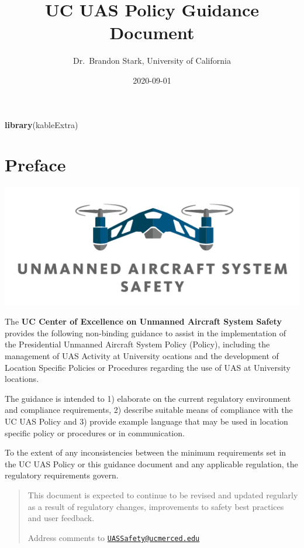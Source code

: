 \documentclass[
]{book}
\title{UC UAS Policy Guidance Document}
\author{Dr.~Brandon Stark, University of California}
\date{2020-09-01}
\newenvironment{Shaded}{\begin{snugshade}}{\end{snugshade}}
\newcommand{\KeywordTok}[1]{\textcolor[rgb]{0.13,0.29,0.53}{\textbf{#1}}}
\newcommand{\NormalTok}[1]{#1}
\begin{document}
\maketitle

{
\setcounter{tocdepth}{1}
\tableofcontents
}
\begin{Shaded}
\begin{Highlighting}[]
\KeywordTok{library}\NormalTok{(kableExtra)}
\end{Highlighting}
\end{Shaded}

\hypertarget{preface}{%
\chapter*{Preface}\label{preface}}

\begin{center}\includegraphics[width=0.5\linewidth]{images/COE_logo} \end{center}

The \textbf{UC Center of Excellence on Unmanned Aircraft System Safety} provides the following non-binding guidance to assist in the implementation of the Presidential Unmanned Aircraft System Policy (Policy), including the management of UAS Activity at University ocations and the development of Location Specific Policies or Procedures regarding the use of UAS at University locations.

The guidance is intended to 1) elaborate on the current regulatory environment and compliance requirements, 2) describe suitable means of compliance with the UC UAS Policy and 3) provide example language that may be used in location specific policy or procedures or in communication.

To the extent of any inconsistencies between the minimum requirements set in the UC UAS Policy or this guidance document and any applicable regulation, the regulatory requirements govern.

\begin{quote}
This document is expected to continue to be revised and updated regularly as a result of regulatory changes, improvements to safety best practices and user feedback.

Address comments to \href{mailto:UASSafety@ucmerced.edu}{\nolinkurl{UASSafety@ucmerced.edu}}
\end{quote}
\end{document}
